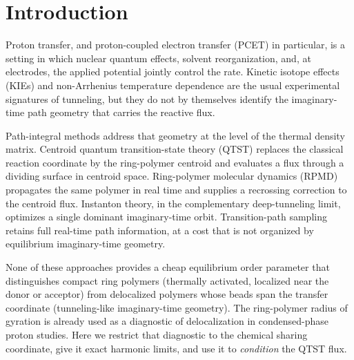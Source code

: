 \documentclass[%
 aip,
 jcp,
 amsmath,amssymb,
 reprint,
 floatfix,
]{revtex4-2}
\begin{document}

\maketitle

\section{Introduction}

Proton transfer, and proton-coupled electron transfer (PCET) in particular, is a setting in which nuclear quantum effects, solvent reorganization, and, at electrodes, the applied potential jointly control the rate.\cite{hammes-schiffer2015,soudackov2000,marcus1956,klinman2013} Kinetic isotope effects (KIEs) and non-Arrhenius temperature dependence are the usual experimental signatures of tunneling,\cite{westheimer1961,klinman2013} but they do not by themselves identify the imaginary-time path geometry that carries the reactive flux.

Path-integral methods address that geometry at the level of the thermal density matrix.\cite{feynman1948,feynman1965,chandler1981} Centroid quantum transition-state theory (QTST) replaces the classical reaction coordinate by the ring-polymer centroid and evaluates a flux through a dividing surface in centroid space.\cite{voth1989,cao1994,gillan1987,hele2013} Ring-polymer molecular dynamics (RPMD) propagates the same polymer in real time and supplies a recrossing correction to the centroid flux.\cite{craig2004,craig2005,habershon2013} Instanton theory, in the complementary deep-tunneling limit, optimizes a single dominant imaginary-time orbit.\cite{richardson2009,richardson2018} Transition-path sampling retains full real-time path information, at a cost that is not organized by equilibrium imaginary-time geometry.\cite{bolhuis2002}

None of these approaches provides a cheap equilibrium order parameter that distinguishes compact ring polymers (thermally activated, localized near the donor or acceptor) from delocalized polymers whose beads span the transfer coordinate (tunneling-like imaginary-time geometry). The ring-polymer radius of gyration is already used as a diagnostic of delocalization in condensed-phase proton studies.\cite{drechsel2014,marsalek2017} Here we restrict that diagnostic to the chemical sharing coordinate, give it exact harmonic limits, and use it to \emph{condition} the QTST flux.
\end{document}

